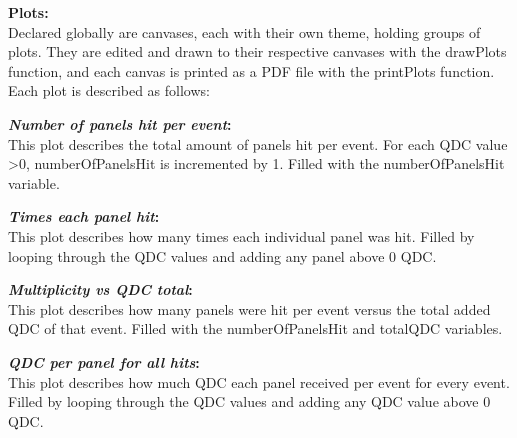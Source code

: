 \documentclass[a4paper,12pt]{article}
\begin{document}
\pagebreak

\textbf{Plots:} \\
Declared globally are canvases, each with their own theme, holding groups of plots. They are edited and drawn to their respective canvases with the drawPlots function, and each canvas is printed as a PDF file with the printPlots function. Each plot is described as follows: \\

\begin{figure}[h]
\centering
{}%
\end{figure}

\textbf{\emph{Number of panels hit per event}:}  \\
This plot describes the total amount of panels hit per event. For each QDC value >0, numberOfPanelsHit is incremented by 1. Filled with the numberOfPanelsHit variable.

\textbf{\emph{Times each panel hit}:} \\
This plot describes how many times each individual panel was hit. Filled by looping through the QDC values and adding any panel above 0 QDC.

\textbf{\emph{Multiplicity vs QDC total}:} \\
This plot describes how many panels were hit per event versus the total added QDC of that event. Filled with the numberOfPanelsHit and totalQDC variables.

\textbf{\emph{QDC per panel for all hits}:} \\
This plot describes how much QDC each panel received per event for every event. Filled by looping through the QDC values and adding any QDC value above 0 QDC.
\end{document}
